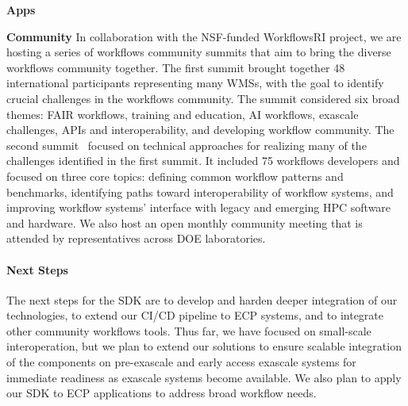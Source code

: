 \textbf{Apps}

\textbf{Community}
In collaboration with the NSF-funded WorkflowsRI project, we are hosting
a series of workflows community summits that aim to bring the diverse
workflows community together. 
The first summit brought together 48 international participants representing many WMSs, 
with the goal to identify crucial challenges in the workflows community. 
The summit considered six broad themes: FAIR workflows, training and education,
AI workflows, exascale challenges, APIs and interoperability, and developing workflow community. 
The second summit~\cite{summit_2} focused on technical approaches for realizing 
many of the challenges identified in the first summit. It included 75 workflows developers %
and focused on three core topics: 
defining common workflow patterns and benchmarks, identifying paths toward interoperability of workflow systems, and improving workflow systems’ interface with legacy and emerging HPC software and hardware.
We also host an open monthly community meeting that is attended by representatives across
DOE laboratories.




\paragraph{Next Steps}


The next steps for the SDK are to develop and harden deeper 
integration of our technologies, to extend our CI/CD pipeline to ECP systems,
and to integrate other community workflows tools.
Thus far, we have focused on small-scale interoperation, but we plan to extend our solutions to
ensure scalable integration of the components on pre-exascale and early access exascale
systems for immediate readiness as exascale systems become available.
We also plan to apply our SDK to ECP applications to address broad workflow needs.
